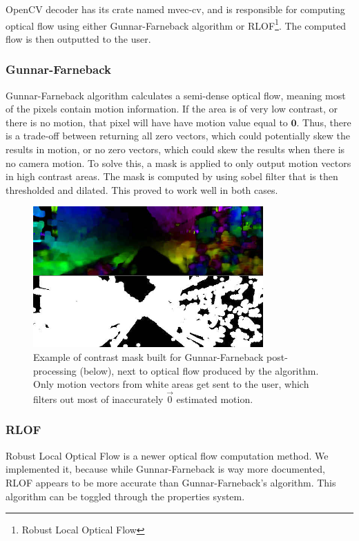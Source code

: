 \documentclass[11pt,english]{report}
\begin{document}
OpenCV decoder has its crate named mvec-cv, and is responsible for computing optical flow using either Gunnar-Farneback algorithm\cite{Farnebck2003TwoFrameME} or RLOF\footnote{Robust Local Optical Flow}\cite{rlof}. The computed flow is then outputted to the user.

\subsubsection{Gunnar-Farneback}

Gunnar-Farneback algorithm calculates a semi-dense optical flow, meaning most of the pixels contain motion information. If the area is of very low contrast, or there is no motion, that pixel will have have motion value equal to $\mathbf{0}$. Thus, there is a trade-off between returning all zero vectors, which could potentially skew the results in motion, or no zero vectors, which could skew the results when there is no camera motion. To solve this, a mask is applied to only output motion vectors in high contrast areas. The mask is computed by using sobel filter that is then thresholded and dilated. This proved to work well in both cases.

\begin{figure}[!ht]
	\centering
	\includegraphics[width=250pt]{docs/report/gunnar-farneback-mask.jpg}
	\caption{\centering Example of contrast mask built for Gunnar-Farneback post-processing (below), next to optical flow produced by the algorithm. Only motion vectors from white areas get sent to the user, which filters out most of inaccurately $\overrightarrow{0}$ estimated motion.}
\end{figure}

\subsubsection{RLOF}

Robust Local Optical Flow is a newer optical flow computation method. We implemented it, because while Gunnar-Farneback is way more documented, RLOF appears to be more accurate than Gunnar-Farneback's algorithm. This algorithm can be toggled through the properties system.
\end{document}
